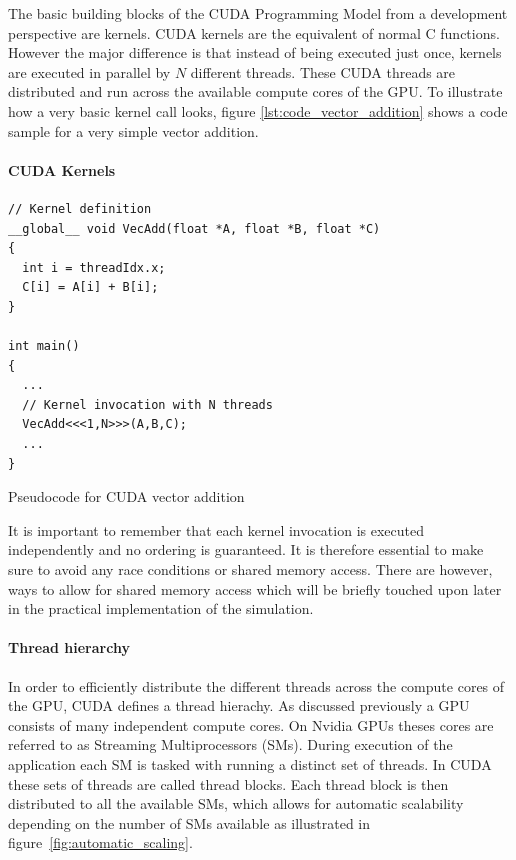 \documentclass[a4paper,11pt]{kth-mag}
\begin{document}
The basic building blocks of the CUDA Programming Model from a development perspective are kernels. CUDA kernels are the equivalent of normal C functions. However the major difference is that instead of being executed just once, kernels are executed in parallel by $N$ different threads. These CUDA threads are distributed and run across the available compute cores of the GPU. To illustrate how a very basic kernel call looks, figure \ref{lst:code_vector_addition} shows a code sample for a very simple vector addition.

\paragraph{CUDA Kernels}

\begin{listing}
  \centering
  \begin{verbatim}
// Kernel definition
__global__ void VecAdd(float *A, float *B, float *C)
{
  int i = threadIdx.x;
  C[i] = A[i] + B[i];
}

int main()
{
  ...
  // Kernel invocation with N threads
  VecAdd<<<1,N>>>(A,B,C);
  ...
}
  \end{verbatim}
  \caption{Pseudocode for CUDA vector addition}
  \label{lst:code_vector_addition}
\end{listing}

It is important to remember that each kernel invocation is executed independently and no ordering is guaranteed. It is therefore essential to make sure to avoid any race conditions or shared memory access. There are however, ways to allow for shared memory access which will be briefly touched upon later in the practical implementation of the simulation.

\paragraph{Thread hierarchy}

In order to efficiently distribute the different threads across the compute cores of the GPU, CUDA defines a thread hierachy. As discussed previously a GPU consists of many independent compute cores. On Nvidia GPUs theses cores are referred to as Streaming Multiprocessors (SMs). During execution of the application each SM is tasked with running a distinct set of threads. In CUDA these sets of threads are called thread blocks. Each thread block is then distributed to all the available SMs, which allows for automatic scalability depending on the number of SMs available  as illustrated in figure~\ref{fig:automatic_scaling}.
\end{document}
